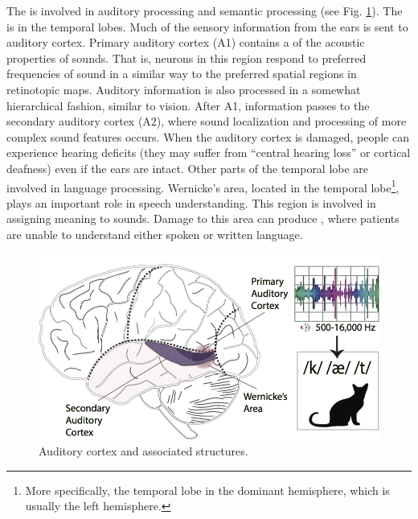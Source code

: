 The  is involved in auditory processing and semantic processing (see Fig. \ref{brain_audition}). The  is in the temporal lobes. Much of the sensory information from the ears is sent to auditory cortex. Primary auditory cortex (A1) contains a  of the acoustic properties of sounds. That is, neurons in this region respond to preferred frequencies of sound in a similar way to the preferred spatial regions in retinotopic maps. Auditory information is also processed in a somewhat hierarchical fashion, similar to vision. After A1, information passes to the secondary auditory cortex (A2), where sound localization and processing of more complex sound features occurs. When the auditory cortex is damaged, people can experience hearing deficits (they may suffer from ``central hearing loss'' or cortical deafness) even if the ears are intact. Other parts of the temporal lobe are involved in language processing. Wernicke's area, located in the temporal lobe\footnote{More specifically, the temporal lobe in the dominant hemisphere, which is usually the left hemisphere.}, plays an important role in speech understanding. This region is involved in assigning meaning to sounds. Damage to this area can produce , where patients are unable to understand either spoken or written language.

\begin{figure}[h]
\centering
\includegraphics[scale=.7]{./images/brain_audition.png}
\caption[Pamela Payne.]{Auditory cortex and associated structures.}
\label{brain_audition}
\end{figure}

